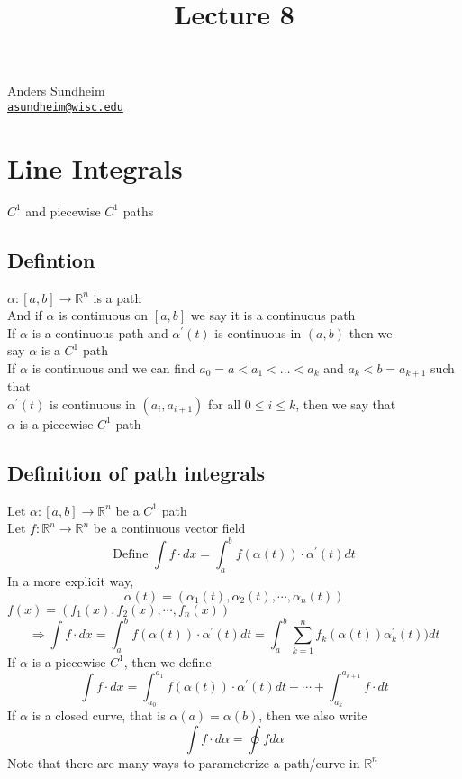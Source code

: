 \documentclass[12pt]{article}
\title{Lecture 8}
\newcommand*\circled[1]{\tikz[baseline=(char.base)]{
    \node[shape=circle,draw,inner sep=2pt] (char) {#1};}}
\newcommand{\BR}{\mathbb R}
\newcommand{\prm}{^\prime}
\begin{document}
\maketitle
\vspace*{-0.25in}
\begin{center}
	Anders Sundheim \\
	\href{mailto:asundheim@wisc.edu}{{\tt asundheim@wisc.edu}}
\end{center}
\section*{Line Integrals}
$C^1$ and piecewise $C^1$ paths
\subsection*{Defintion}
$\alpha:[a,b]\rightarrow\BR^n$ is a path \\
And if $\alpha$ is continuous on $[a,b]$ we say it is a continuous path \\
If $\alpha$ is a continuous path and $\alpha\prm(t)$ is continuous in $(a,b)$ then we \\
say $\alpha$ is a $C^1$ path \\
If $\alpha$ is continuous and we can find $a_0=a<a_1<\dots<a_k$ and $a_k<b=a_{k+1}$ such that \\
$\alpha\prm(t)$ is continuous in $(a_i,a_{i+1})$ for all $0\leq i\leq k$, then we say that \\
$\alpha$ is a piecewise $C^1$ path \\
\subsection*{Definition of path integrals}
  \circled{1} Let $\alpha:[a,b]\rightarrow\BR^n$ be a $C^1$ path \\
  Let $f:\BR^n\rightarrow\BR^n$ be a continuous vector field \\
  \[ \text{Define }\int f\cdot dx=\int_a^bf(\alpha(t))\cdot\alpha\prm(t)dt \]
  In a more explicit way, \\
  \[ \alpha(t)=(\alpha_1(t),\alpha_2(t),\cdots,\alpha_n(t)) \]
  $f(x) = (f_1(x), f_2(x),\cdots,f_n(x))$ \\
  \[ \Rightarrow\int f\cdot dx=\int_a^b f(\alpha(t))\cdot\alpha\prm(t)dt=\int_a^b\sum_{k=1}^nf_k(\alpha(t))\alpha\prm_k(t))dt \]
  \circled{2} If $\alpha$ is a piecewise $C^1$, then we define \\
  \[ \int f\cdot dx=\int_{a_0}^{a_1}f(\alpha(t))\cdot\alpha\prm(t)dt+\cdots+\int_{a_k}^{a_{k+1}}f\cdot dt \]
  \circled{3} If $\alpha$ is a closed curve, that is $\alpha(a)=\alpha(b)$, then we also write \\
  \[ \int f\cdot d\alpha=\oint fd\alpha \]
  Note that there are many ways to parameterize a path/curve in $\BR^n$ \\
\end{document}
